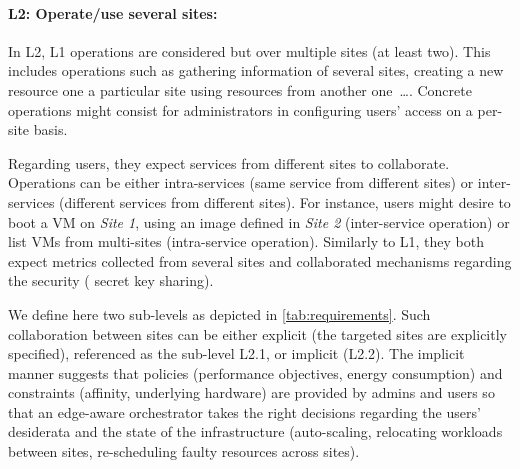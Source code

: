 


\paragraph{L2: Operate/use several sites:}

In L2, L1 operations are considered but over multiple sites (at least
two).  This includes operations such as gathering information of
several sites, creating a new resource one a particular site using
resources from another one~\ldots.
%
Concrete operations might consist for administrators in configuring users' access on a per-site basis.


Regarding users, they expect
services from different sites to collaborate.
Operations can be either intra-services (same service from different sites) or
inter-services (different services from different sites).
%
For instance, users might desire to boot a VM on \emph{Site 1}, using an image
defined in \emph{Site 2} (inter-service operation) or list VMs from multi-sites
(intra-service operation). Similarly to L1, they both expect metrics collected
from several sites and collaborated mechanisms regarding the security (\eg
secret key sharing).

We define here two sub-levels as depicted in \cref{tab:requirements}. Such
collaboration between sites can be either explicit (\ie the targeted sites are
explicitly specified), referenced as the sub-level L2.1, or implicit (L2.2).
The implicit manner suggests that policies (\eg performance objectives, energy
consumption) and constraints (\eg affinity, underlying hardware) are provided
by admins and users so that an edge-aware orchestrator takes the right
decisions regarding the users' desiderata and the state of the infrastructure
(\eg auto-scaling, relocating workloads between sites, re-scheduling faulty
resources across sites).

